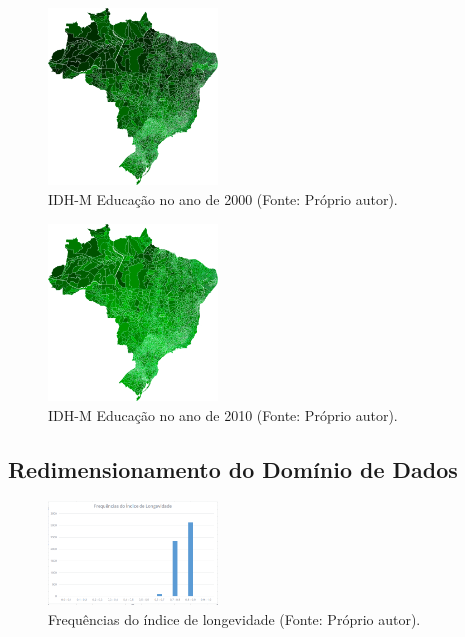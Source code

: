 \documentclass[conference]{IEEEtran}
\begin{document}
\begin{figure}[!ht]
\centering
\includegraphics[width=0.40\textwidth]{educacao-2000.png}
\caption{IDH-M Educação no ano de 2000 (Fonte: Próprio autor).}
\label{img:educacao-2000}
\end{figure}

\begin{figure}[!ht]
\centering
\includegraphics[width=0.40\textwidth]{educacao-2010.png}
\caption{IDH-M Educação no ano de 2010 (Fonte: Próprio autor).}
\label{img:educacao-2010}
\end{figure}


\subsection{Redimensionamento do Domínio de Dados}

\begin{figure}[!ht]
\centering
\includegraphics[width=0.40\textwidth]{frequencia.png}
\caption{Frequências do índice de longevidade (Fonte: Próprio autor).}
\label{img:histograma}
\end{figure}
\end{document}
